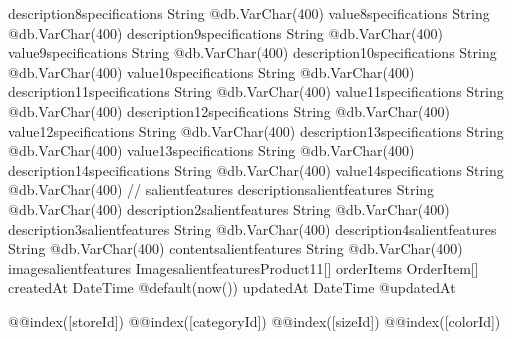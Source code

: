 {  description8specifications   String                         @db.VarChar(400)
  value8specifications         String                         @db.VarChar(400)
  description9specifications   String                         @db.VarChar(400)
  value9specifications         String                         @db.VarChar(400)
  description10specifications  String                         @db.VarChar(400)
  value10specifications        String                         @db.VarChar(400)
  description11specifications  String                         @db.VarChar(400)
  value11specifications        String                         @db.VarChar(400)
  description12specifications  String                         @db.VarChar(400)
  value12specifications        String                         @db.VarChar(400)
  description13specifications  String                         @db.VarChar(400)
  value13specifications        String                         @db.VarChar(400)
  description14specifications  String                         @db.VarChar(400)
  value14specifications        String                         @db.VarChar(400)
  // salientfeatures
  descriptionsalientfeatures   String                         @db.VarChar(400)
  description2salientfeatures  String                         @db.VarChar(400)
  description3salientfeatures  String                         @db.VarChar(400)
  description4salientfeatures  String                         @db.VarChar(400)
  contentsalientfeatures       String                         @db.VarChar(400)
  imagesalientfeatures ImagesalientfeaturesProduct11[]
  orderItems                   OrderItem[]
  createdAt                    DateTime                       @default(now())
  updatedAt                    DateTime                       @updatedAt

  @@index([storeId])
  @@index([categoryId])
  @@index([sizeId])
  @@index([colorId])
}

